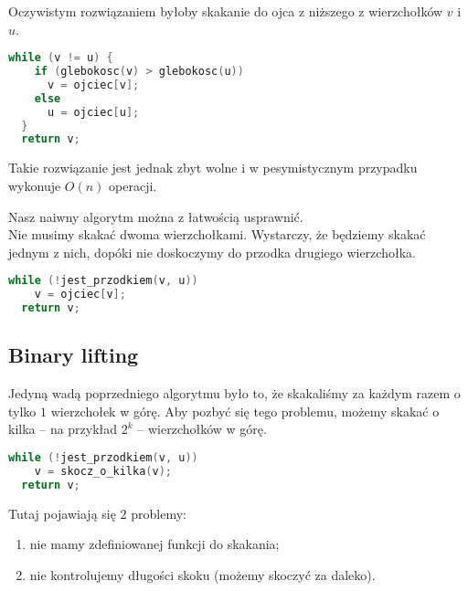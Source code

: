 \documentclass[../main.tex]{subfiles}
\begin{document}
\begin{frame}[fragile]{\subsecname}
Oczywistym rozwiązaniem byłoby skakanie do ojca z niższego z wierzchołków $v$ i $u$.

\pause

\begin{block}{}
\begin{lstlisting}[language=C++]
  while (v != u) {
    if (glebokosc(v) > glebokosc(u))
      v = ojciec[v];
    else
      u = ojciec[u];
  }
  return v;
\end{lstlisting}
\end{block}

\pause

Takie rozwiązanie jest jednak zbyt wolne i w pesymistycznym przypadku wykonuje
$O(n)$ operacji.

\end{frame}

\begin{frame}[fragile]{\subsecname}
Nasz naiwny algorytm można z łatwością usprawnić.\\
\pause
Nie musimy skakać dwoma wierzchołkami. Wystarczy, że będziemy skakać jednym z nich, dopóki
nie doskoczymy do przodka drugiego wierzchołka.
\pause
\begin{block}{}
\begin{lstlisting}[language=C++]
  while (!jest_przodkiem(v, u))
    v = ojciec[v];
  return v;
\end{lstlisting}
\end{block}

\end{frame}

\subsection{Binary lifting}

\begin{frame}[fragile]{\subsecname}
Jedyną wadą poprzedniego algorytmu było to, że skakaliśmy za każdym razem o tylko $1$
wierzchołek w górę. \pause Aby pozbyć się tego problemu, możemy skakać o kilka -- na przykład 
$2^k$ -- wierzchołków w górę.

\pause
\begin{block}{}
\begin{lstlisting}[language=C++]
  while (!jest_przodkiem(v, u))
    v = skocz_o_kilka(v);
  return v;
\end{lstlisting}
\end{block}

\pause
Tutaj pojawiają się $2$ problemy:
\begin{enumerate}
  \pause\item nie mamy zdefiniowanej funkcji do skakania;
  \pause\item nie kontrolujemy długości skoku (możemy skoczyć za daleko).
\end{enumerate}

\end{frame}
\end{document}
